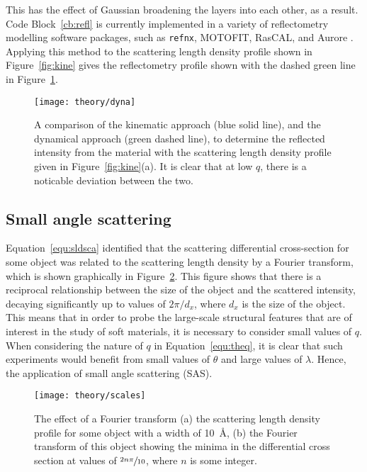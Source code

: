 This has the effect of Gaussian broadening the layers into each other, as a result. Code Block~\ref{cb:refl} is currently implemented in a variety of reflectometry modelling software packages, such as \texttt{refnx}, MOTOFIT, RasCAL, and Aurore \cite{nelson_refnx_2019,nelson_co-refinement_2006,hughes_rascal_nodate,gerelli_aurore_2016-1,gerelli_aurore_2016}.
Applying this method to the scattering length density profile shown in Figure~\ref{fig:kine} gives the reflectometry profile shown with the dashed green line in Figure~\ref{fig:dyna}.
%
\begin{figure}
    \centering
        
\end{figure}
%
%
\begin{figure}
    \centering
    \texttt{[image: theory/dyna]}
    \caption{A comparison of the kinematic approach (blue solid line), and the dynamical approach (green dashed line), to determine the reflected intensity from the material with the scattering length density profile given in Figure~\ref{fig:kine}(a). It is clear that at low $q$, there is a noticable deviation between the two.}
    \label{fig:dyna}
\end{figure}
%


\subsection{Small angle scattering}
\label{sec:sasanal}

Equation~\ref{equ:sldsca} identified that the scattering differential cross-section for some object was related to the scattering length density by a Fourier transform, which is shown graphically in Figure~\ref{fig:scales}.
This figure shows that there is a reciprocal relationship between the size of the object and the scattered intensity, decaying significantly up to values of $2\pi/d_x$, where $d_x$ is the size of the object.
This means that in order to probe the large-scale structural features that are of interest in the study of soft materials, it is necessary to consider small values of $q$.
When considering the nature of $q$ in Equation~\ref{equ:theq}, it is clear that such experiments would benefit from small values of $\theta$ and large values of $\lambda$.
Hence, the application of small angle scattering (SAS).
%
\begin{figure}
    \centering
    \texttt{[image: theory/scales]}
    \caption{The effect of a Fourier transform (a) the scattering length density profile for some object with a width of \SI{10}{\angstrom}, (b) the Fourier transform of this object showing the minima in the differential cross section at values of $\sfrac{2n\pi}{10}$, where $n$ is some integer.}
    \label{fig:scales}
\end{figure}
%

